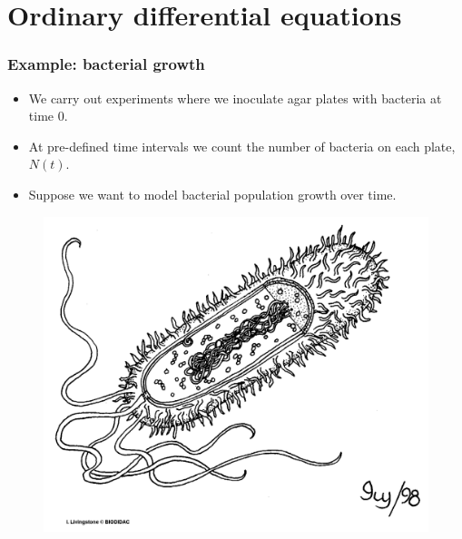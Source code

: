 \documentclass[handout]{beamer}
\begin{document}
\section{Ordinary differential equations}
\frame{\tableofcontents[currentsection]}

\begin{frame}
	\frametitle{Example: bacterial growth}
	\begin{itemize}
		\item<2-> We carry out experiments where we inoculate agar plates with bacteria at time 0.
		\item<3-> At pre-defined time intervals we count the number of bacteria on each plate, $N(t)$.
		\item<4-> Suppose we want to model bacterial population growth over time.
	\end{itemize}
	
	\begin{figure}[ht]
		\centerline{\includegraphics[width=1\textwidth]{figures/bacteria.png}}
	\end{figure}
	
\end{frame}
\end{document}
